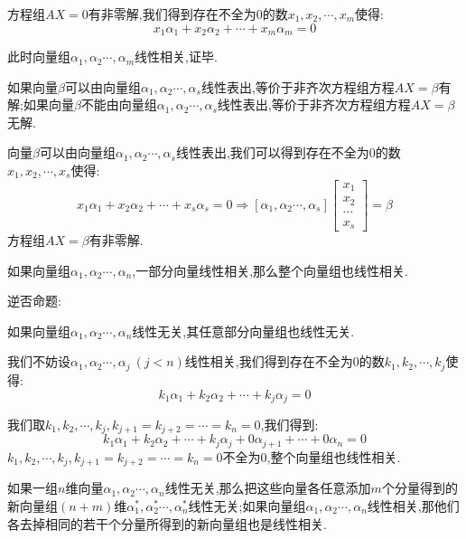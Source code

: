 \begin{theorem}[判别线性相关性的七大定理]
\begin{anymark}[证明]
		方程组$AX=0$有非零解,我们得到存在不全为$0$的数$x_{1},x_{2},\cdots,x_{m}$使得:  
		$$x_{1}\alpha_{1}+x_{2}\alpha_{2}+\cdots+x_{m}\alpha_{m}=0$$
		
		此时向量组$\alpha_{1},\alpha_{2}\cdots,\alpha_{m}$线性相关,证毕.
	\end{anymark}
	
	
	如果向量$\beta$可以由向量组$\alpha_{1},\alpha_{2}\cdots,\alpha_{s}$线性表出,等价于非齐次方程组方程$AX=\beta$有解;如果向量$\beta$不能由向量组$\alpha_{1},\alpha_{2}\cdots,\alpha_{s}$线性表出,等价于非齐次方程组方程$AX=\beta$无解.
	\begin{anymark}[证明]
		向量$\beta$可以由向量组$\alpha_{1},\alpha_{2}\cdots,\alpha_{s}$线性表出,我们可以得到存在不全为$0$的数$x_{1},x_{2},\cdots,x_{s}$使得:  
		$$x_{1}\alpha_{1}+x_{2}\alpha_{2}+\cdots+x_{s}\alpha_{s}=0\Rightarrow [\alpha_{1},\alpha_{2}\cdots,\alpha_{s}]\left[\begin{matrix}
			x_{1}\\
			x_{2}\\
			\cdots\\
			x_{s}
		\end{matrix} \right] =\beta$$
		方程组$AX=\beta$有非零解. 
	\end{anymark}
	
	
	如果向量组$\alpha_{1},\alpha_{2}\cdots,\alpha_{n}$,一部分向量线性相关,那么整个向量组也线性相关.
	
	逆否命题:  
	
	如果向量组$\alpha_{1},\alpha_{2}\cdots,\alpha_{n}$线性无关,其任意部分向量组也线性无关.
	\begin{anymark}[证明]
		 我们不妨设$\alpha_{1},\alpha_{2}\cdots,\alpha_{j}\ (j< n)$线性相关,我们得到存在不全为$0$的数$k_{1},k_{2},\cdots,k_{j}$使得:  
		 $$k_{1}\alpha_{1}+k_{2}\alpha_{2}+\cdots+k_{j}\alpha_{j}=0$$
		 
		我们取$k_{1},k_{2},\cdots,k_{j},k_{j+1}=k_{j+2}=\cdots=k_{n}=0$,我们得到:  
		$$k_{1}\alpha_{1}+k_{2}\alpha_{2}+\cdots+k_{j}\alpha_{j}+0\alpha_{j+1}+\cdots+0\alpha_{n}=0$$
		$k_{1},k_{2},\cdots,k_{j},k_{j+1}=k_{j+2}=\cdots=k_{n}=0$不全为$0$,整个向量组也线性相关.
	\end{anymark}
	
	
	如果一组$n$维向量$\alpha_{1},\alpha_{2}\cdots,\alpha_{n}$线性无关,那么把这些向量各任意添加$m$个分量得到的新向量组$(n+m)\text{维}$$\alpha_{1}^{*},\alpha_{2}^{*}\cdots,\alpha_{n}^{*}$线性无关;如果向量组$\alpha_{1},\alpha_{2}\cdots,\alpha_{n}$线性相关,那他们各去掉相同的若干个分量所得到的新向量组也是线性相关.
	
\end{theorem}
